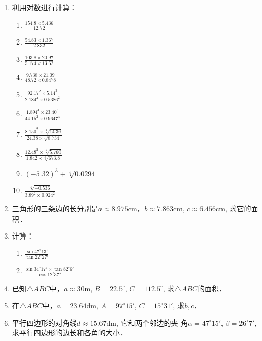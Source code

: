 \begin{enumerate}
    \item 利用对数进行计算：
\begin{multicols}{2}
\begin{enumerate}
    \item $\frac{154.8 \times 5.436}{12.72}$
    \item $\frac{54.83 \times 1.367}{2.832}$
    \item $\frac{103.8 \times 20.97}{5.174 \times 13.62}$
    \item $\frac{9.738 \times 21.09}{48.72 \times 0.8478}$
    \item $\frac{92.17^{2} \times 5.14^{3}}{2.184^{4} \times 0.5386^{2}}$
    \item $\frac{1.894^{4} \times 23.40^{3}}{44.15^{2} \times 0.9647^{3}}$
    \item  $\frac{8.150^{2} \times \sqrt[3]{14.36}}{24.38 \times \sqrt{8.734}}$
    \item $ \frac{12.48^{3} \times \sqrt[4]{5.760}}{1.842 \times \sqrt[3]{673.8}}$
    \item $(-5.32)^{3}+\sqrt[4]{0.0294}$
    \item $\frac{\sqrt[3]{-0.536}}{3.89^{2} \times 0.924^{2}}$
\end{enumerate}
\end{multicols}
\item 三角形的三条边的长分别是$a\approx 8.975$cm，$b \approx 7.863$cm, $c\approx 6.456$cm, 求它的面积．

\item  计算：
\begin{multicols}{2}
\begin{enumerate}
    \item $\frac{\sin 47^{\circ} 13'}{\tan22^{\circ} 27'}$
    \item $\frac{\sin 34^{\circ} 17' \times \tan82^{\circ} 6'}{\cos 12^{\circ} 37'}$
\end{enumerate}
\end{multicols}
\item 已知$\triangle ABC$中，$a\approx30$m, $B=22.5^{\circ}$, $C=112.5^{\circ}$, 求$\triangle ABC$的面积．

\item 在$\triangle ABC$中，$a=23.64$dm, $A=97^{\circ}15'$, $C=15^{\circ}31'$,
求$b,c$．
\item 
平行四边形的对角线$d\approx 15.67$dm, 它和两个邻边的夹
角$\alpha=47^{\circ}15'$, $\beta=26^{\circ}7'$, 求平行四边形的边长和各角的大小．


\end{enumerate}
